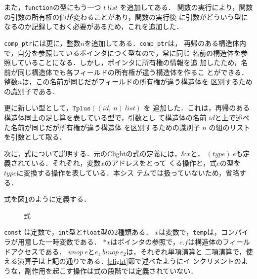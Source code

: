 また，\texttt{function}の型にもう一つ $t\ \mathit{list}$ を追加してある．
関数の実行により，関数の引数の所有権の値が変わることがあり，関数の実行後
に引数がどういう型になるのか記録しておく必要があるため，これを追加した．

\texttt{comp\_ptr}には更に，整数$n$を追加してある．\texttt{comp\_ptr}は，
再帰のある構造体内で，自分を参照しているポインタにつく型なので，常に同じ
名前の構造体を参照していることになる．しかし，ポインタに所有権の情報を追
加したため，名前が同じ構造体でも各フィールドの所有権が違う構造体を作るこ
とができる．整数$n$は，この名前が同じだがフィールドの所有権が違う構造体を
区別するための識別子である．

更に新しい型として，$\texttt{Tplus}((\mathit{id},\ n)\ \mathit{list})$ を
追加した．これは，再帰のある構造体同士の足し算を表している型で，引数とし
て構造体の名前 $\mathit{id}$と上で述べた名前が同じだが所有権が違う構造体
を区別するための識別子 $n$ の組のリストを引数として取る．


次に，式について説明する．元のClightの式の定義には，$\&x$と，
$(\mathit{type})\ e$も定義されている．それぞれ，変数$x$のアドレスをとって
くる操作と，式$e$の型を$\mathit{type}$に変換する操作を表している．本シス
テムでは扱っていないため，省略する．

\begin{definition}[式]
式を図\ref{clight_expr}のように定義する．
\end{definition}
\begin{figure}[htbp]
  \centering
  \caption{式}
  \label{clight_expr}
\end{figure}

\texttt{const} は定数で，\texttt{int}型と\texttt{float}型の2種類ある．
$x$は変数で，\texttt{temp}は，コンパイラが用意した一時変数である．
$\mathit{*x}$はポインタの参照で，$e.f$は構造体のフィールドアクセスである．
$\mathit{unop}\ e$と$e_{1}\ \mathit{binop}\ e_{2}$は，それぞれ単項演算と
二項演算で，使える演算子は上記の通りである．\ref{clight}節で述べたようにイ
ンクリメントのような，副作用を起こす操作は式の段階では定義されていない．

